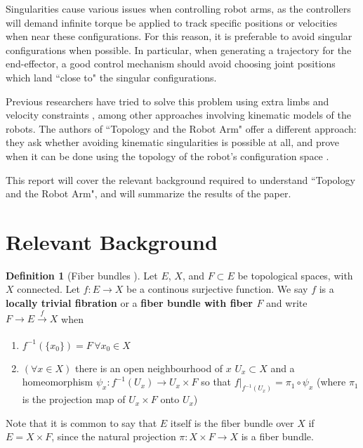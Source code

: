 \documentclass[12pt]{article}
\theoremstyle{definition}
\newtheorem{defn}{Definition}
\begin{document}
Singularities cause various issues when controlling robot arms, as the
controllers will demand infinite torque be applied to track specific positions
or velocities when near these configurations. For this reason, it is preferable
to avoid singular configurations when possible. In particular, when generating a
trajectory for the end-effector, a good control mechanism should avoid choosing
joint positions which land ``close to" the singular configurations.

Previous researchers have tried to solve this problem using extra limbs
\cite{program-kin-red-manips} and velocity constraints
\cite{articulated-robot-redundancy}, among other approaches involving kinematic
models of the robots. The authors of
``Topology and the Robot Arm" offer a different approach: they ask whether
avoiding kinematic singularities is possible at all, and prove when it can be
done using the topology of the robot's configuration space
\cite{topology-robot-arm}.

This report will cover the relevant background required to understand 
``Topology and the Robot Arm",
and will summarize the results of the paper.

\section{Relevant Background}
\begin{defn}[Fiber bundles \cite{topology-fiber-bundles}]
    Let \(E\), \(X\), and \(F \subset E\) be topological spaces, 
    with \(X\) connected.
    Let \(f : E \rightarrow X\) be a continous surjective function. 
    We say \(f\) is a \textbf{locally trivial fibration} or a 
    \textbf{fiber bundle with fiber \(F\)} and write 
    \(F \rightarrow E \xrightarrow[]{f} X\) when
    \begin{enumerate}
        \item \(f^{-1}(\{x_0\}) = F \, \forall x_0 \in X\)
        \item \((\forall x \in X)\) there is an open neighbourhood of \(x\)
            \(U_x \subset X\) and a homeomorphism
            \(\psi_x : f^{-1}(U_x) \rightarrow U_x \times F\) so that
            \(f\vert_{f^{-1}(U_x)} = \pi_1 \circ \psi_x\) (where \(\pi_1\)
            is the projection map of \(U_x \times F\) onto \(U_x\))
    \end{enumerate}
    Note that it is common to say that \(E\) itself is the fiber bundle over
    \(X\) if \(E = X \times F\), since the natural projection 
    \(\pi : X \times F \rightarrow X\) is a fiber bundle.
\end{defn}
\end{document}
